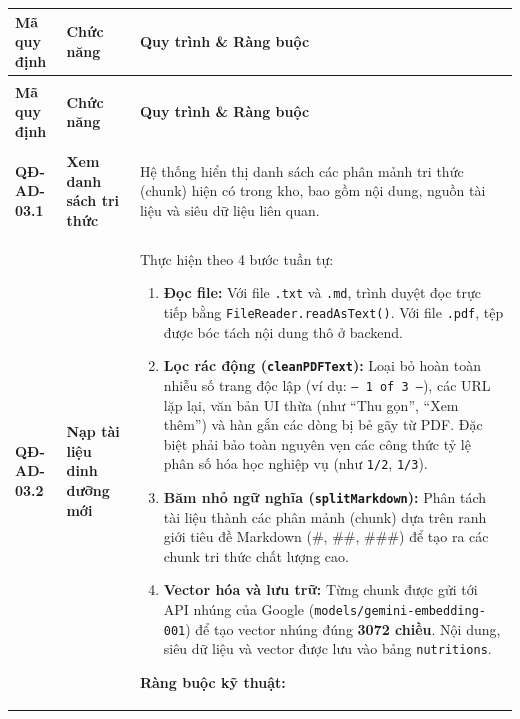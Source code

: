 \documentclass[12pt,a4paper]{article}
\begin{document}
\begin{longtable}{|
        >{\raggedright\arraybackslash}p{2.2cm}|
        >{\raggedright\arraybackslash}p{2.8cm}|
        >{\raggedright\arraybackslash}p{9.8cm}|}
    \hline
    \rowcolor{headerblue}
    \textbf{Mã quy định} & \textbf{Chức năng} & \textbf{Quy trình \& Ràng buộc} \\
    \hline
    \endfirsthead
    \multicolumn{3}{c}{{\tablename\ -- Tiếp theo trang trước}} \\
    \hline
    \rowcolor{headerblue}
    \textbf{Mã quy định} & \textbf{Chức năng} & \textbf{Quy trình \& Ràng buộc} \\
    \hline
    \endhead
    \hline \multicolumn{3}{|r|}{{Tiếp tục ở trang sau...}} \\ \hline
    \endfoot
    \hline
    \endlastfoot
    \textbf{QĐ-AD-03.1} & \textbf{Xem danh sách tri thức} &
    Hệ thống hiển thị danh sách các phân mảnh tri thức (chunk) hiện có trong kho, bao gồm nội dung, nguồn tài liệu và siêu dữ liệu liên quan. \\
    \hline
    \textbf{QĐ-AD-03.2} & \textbf{Nạp tài liệu dinh dưỡng mới} &
    Thực hiện theo 4 bước tuần tự:
    \begin{enumerate}[leftmargin=*,topsep=2pt,itemsep=1pt]
        \item \textbf{Đọc file:} Với file \texttt{.txt} và \texttt{.md}, trình duyệt đọc trực tiếp bằng \texttt{FileReader.readAsText()}. Với file \texttt{.pdf}, tệp được bóc tách nội dung thô ở backend.
        \item \textbf{Lọc rác động (\texttt{cleanPDFText}):} Loại bỏ hoàn toàn nhiễu số trang độc lập (ví dụ: \texttt{-- 1 of 3 --}), các URL lặp lại, văn bản UI thừa (như ``Thu gọn'', ``Xem thêm'') và hàn gắn các dòng bị bẻ gãy từ PDF. Đặc biệt phải bảo toàn nguyên vẹn các công thức tỷ lệ phân số hóa học nghiệp vụ (như \texttt{1/2}, \texttt{1/3}).
        \item \textbf{Băm nhỏ ngữ nghĩa (\texttt{splitMarkdown}):} Phân tách tài liệu thành các phân mảnh (chunk) dựa trên ranh giới tiêu đề Markdown (\#, \#\#, \#\#\#) để tạo ra các chunk tri thức chất lượng cao.
        \item \textbf{Vector hóa và lưu trữ:} Từng chunk được gửi tới API nhúng của Google (\texttt{models/gemini-embedding-001}) để tạo vector nhúng đúng \textbf{3072 chiều}. Nội dung, siêu dữ liệu và vector được lưu vào bảng \texttt{nutritions}.
    \end{enumerate}
    \textbf{Ràng buộc kỹ thuật:}
    \begin{itemize}[leftmargin=*,topsep=2pt,itemsep=1pt]

\end{itemize}
\end{longtable}
\end{document}
